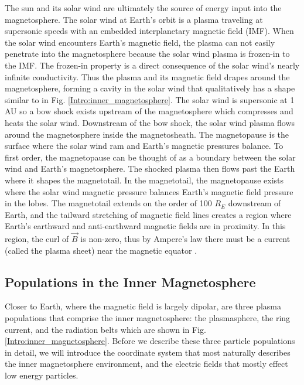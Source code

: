 The sun and its solar wind are ultimately the source of energy input into the magnetosphere. The solar wind at Earth's orbit is a plasma traveling at supersonic speeds with an embedded interplanetary magnetic field (IMF). When the solar wind encounters Earth's magnetic field, the plasma can not easily penetrate into the magnetosphere because the solar wind plasma is frozen-in to the IMF. The frozen-in property is a direct consequence of the solar wind's nearly infinite conductivity. Thus the plasma and its magnetic field drapes around the magnetosphere, forming a cavity in the solar wind that qualitatively has a shape similar to in Fig. \ref{Intro:inner_magnetosphere}. The solar wind is supersonic at 1 AU so a bow shock exists upstream of the magnetosphere which compresses and heats the solar wind. Downstream of the bow shock, the solar wind plasma flows around the magnetosphere inside the magnetosheath. The magnetopause is the surface where the solar wind ram and Earth's magnetic pressures balance. To first order, the magnetopause can be thought of as a boundary between the solar wind and Earth's magnetosphere. The shocked plasma then flows past the Earth where it shapes the magnetotail. In the magnetotail, the magnetopause exists where the solar wind magnetic pressure balances Earth's magnetic field pressure in the lobes. The magnetotail extends on the order of 100 $R_E$ downstream of Earth, and the tailward stretching of magnetic field lines creates a region where Earth's earthward and anti-earthward magnetic fields are in proximity. In this region, the curl of $\vec{B}$ is non-zero, thus by Ampere's law there must be a current (called the plasma sheet) near the magnetic equator \citep[e.g.][]{Eastwood2015}.

\subsection{Populations in the Inner Magnetosphere}\label{Intro:inner_mag}
Closer to Earth, where the magnetic field is largely dipolar, are three plasma populations that comprise the inner magnetosphere: the plasmasphere, the ring current, and the radiation belts which are shown in Fig. \ref{Intro:inner_magnetosphere}. Before we describe these three particle populations in detail, we will introduce the coordinate system that most naturally describes the inner magnetosphere environment, and the electric fields that mostly effect low energy particles.

